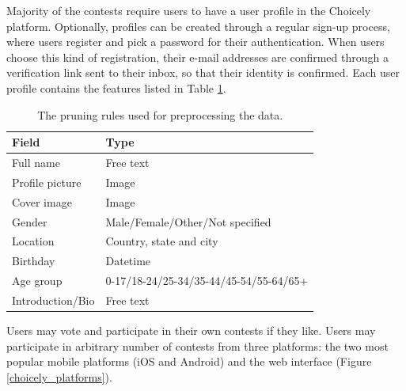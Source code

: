     Majority of the contests require users to have a user profile in the Choicely platform. Optionally, profiles can be created through a regular sign-up process, where users register and pick a password for their authentication. When users choose this kind of registration, their e-mail addresses are confirmed through a verification link sent to their inbox, so that their identity is confirmed. Each user profile contains the features listed in Table \ref{user_profile_fields}. 

    \begin {table}[]
        \centering
        \begin{tabular}{l|l}
            \textbf{Field}              & \textbf{Type} \\
            \hline
            Full name                   & Free text \\
            Profile picture             & Image \\ 
            Cover image                 & Image \\
            Gender                      & Male/Female/Other/Not specified \\
            Location                    & Country, state and city \\
            Birthday                    & Datetime \\ 
            Age group                   & 0-17/18-24/25-34/35-44/45-54/55-64/65+ \\
            Introduction/Bio            & Free text
        \end{tabular}
        \caption{The pruning rules used for preprocessing the data.}
        \label{user_profile_fields}
    \end{table}

    Users may vote and participate in their own contests if they like. Users may participate in arbitrary number of contests from three platforms: the two most popular mobile platforms (iOS and Android) and the web interface (Figure \ref{choicely_platforms}). 
    
